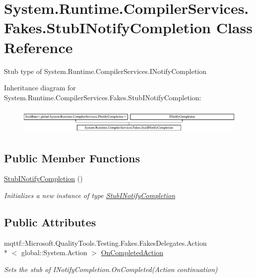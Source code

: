 \hypertarget{class_system_1_1_runtime_1_1_compiler_services_1_1_fakes_1_1_stub_i_notify_completion}{\section{System.\-Runtime.\-Compiler\-Services.\-Fakes.\-Stub\-I\-Notify\-Completion Class Reference}
\label{class_system_1_1_runtime_1_1_compiler_services_1_1_fakes_1_1_stub_i_notify_completion}
}


Stub type of System.\-Runtime.\-Compiler\-Services.\-I\-Notify\-Completion 


Inheritance diagram for System.\-Runtime.\-Compiler\-Services.\-Fakes.\-Stub\-I\-Notify\-Completion\-:\begin{figure}[H]
\begin{center}
\leavevmode
\includegraphics[height=1.305361cm]{class_system_1_1_runtime_1_1_compiler_services_1_1_fakes_1_1_stub_i_notify_completion}
\end{center}
\end{figure}
\subsection*{Public Member Functions}
\begin{DoxyCompactItemize}
\item 
\hyperlink{class_system_1_1_runtime_1_1_compiler_services_1_1_fakes_1_1_stub_i_notify_completion_a72364f2707d9d6976789b4819574370c}{Stub\-I\-Notify\-Completion} ()
\begin{DoxyCompactList}\small\item\em Initializes a new instance of type \hyperlink{class_system_1_1_runtime_1_1_compiler_services_1_1_fakes_1_1_stub_i_notify_completion}{Stub\-I\-Notify\-Completion}\end{DoxyCompactList}\end{DoxyCompactItemize}
\subsection*{Public Attributes}
\begin{DoxyCompactItemize}
\item 
mqttf\-::\-Microsoft.\-Quality\-Tools.\-Testing.\-Fakes.\-Fakes\-Delegates.\-Action\\*
$<$ global\-::\-System.\-Action $>$ \hyperlink{class_system_1_1_runtime_1_1_compiler_services_1_1_fakes_1_1_stub_i_notify_completion_a8a236cc5fb172b9a39f3e586f244db74}{On\-Completed\-Action}
\begin{DoxyCompactList}\small\item\em Sets the stub of I\-Notify\-Completion.\-On\-Completed(\-Action continuation)\end{DoxyCompactList}\end{DoxyCompactItemize}



